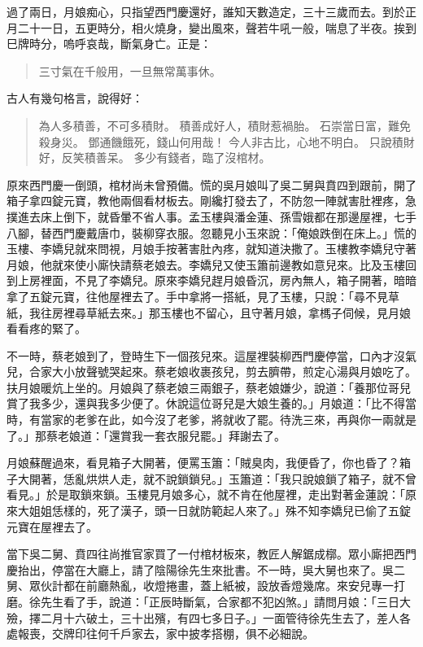 過了兩日，月娘痴心，只指望西門慶還好，誰知天數造定，三十三歲而去。到於正月二十一日，五更時分，相火燒身，變出風來，聲若牛吼一般，喘息了半夜。挨到巳牌時分，嗚呼哀哉，斷氣身亡。正是：
\begin{quote}
三寸氣在千般用，一旦無常萬事休。
\end{quote}
古人有幾句格言，說得好：
\begin{quote}
為人多積善，不可多積財。
積善成好人，積財惹禍胎。
石崇當日富，難免殺身災。
鄧通饑餓死，錢山何用哉！
今人非古比，心地不明白。
只說積財好，反笑積善呆。
多少有錢者，臨了沒棺材。
\end{quote}

原來西門慶一倒頭，棺材尚未曾預備。慌的吳月娘叫了吳二舅與賁四到跟前，開了箱子拿四錠元寶，教他兩個看材板去。剛纔打發去了，不防忽一陣就害肚裡疼，急撲進去床上倒下，就昏暈不省人事。孟玉樓與潘金蓮、孫雪娥都在那邊屋裡，七手八腳，替西門慶戴唐巾，裝柳穿衣服。忽聽見小玉來說：「俺娘跌倒在床上。」慌的玉樓、李嬌兒就來問視，月娘手按著害肚內疼，就知道決撒了。玉樓教李嬌兒守著月娘，他就來使小廝快請蔡老娘去。李嬌兒又使玉簫前邊教如意兒來。比及玉樓回到上房裡面，不見了李嬌兒。原來李嬌兒趕月娘昏沉，房內無人，箱子開著，暗暗拿了五錠元寶，往他屋裡去了。手中拿將一搭紙，見了玉樓，只說：「尋不見草紙，我往房裡尋草紙去來。」那玉樓也不留心，且守著月娘，拿榪子伺候，見月娘看看疼的緊了。

不一時，蔡老娘到了，登時生下一個孩兒來。這屋裡裝柳西門慶停當，口內才沒氣兒，合家大小放聲號哭起來。蔡老娘收裹孩兒，剪去臍帶，煎定心湯與月娘吃了。扶月娘暖炕上坐的。月娘與了蔡老娘三兩銀子，蔡老娘嫌少，說道：「養那位哥兒賞了我多少，還與我多少便了。休說這位哥兒是大娘生養的。」月娘道：「比不得當時，有當家的老爹在此，如今沒了老爹，將就收了罷。待洗三來，再與你一兩就是了。」那蔡老娘道：「還賞我一套衣服兒罷。」拜謝去了。

月娘蘇醒過來，看見箱子大開著，便罵玉簫：「賊臭肉，我便昏了，你也昏了？箱子大開著，恁亂烘烘人走，就不說鎖鎖兒。」玉簫道：「我只說娘鎖了箱子，就不曾看見。」於是取鎖來鎖。玉樓見月娘多心，就不肯在他屋裡，走出對著金蓮說：「原來大姐姐恁樣的，死了漢子，頭一日就防範起人來了。」殊不知李嬌兒已偷了五錠元寶在屋裡去了。

當下吳二舅、賁四往尚推官家買了一付棺材板來，教匠人解鋸成槨。眾小廝把西門慶抬出，停當在大廳上，請了陰陽徐先生來批書。不一時，吳大舅也來了。吳二舅、眾伙計都在前廳熱亂，收燈捲畫，蓋上紙被，設放香燈幾席。來安兒專一打磨。徐先生看了手，說道：「正辰時斷氣，合家都不犯凶煞。」請問月娘：「三日大殮，擇二月十六破土，三十出殯，有四七多日子。」一面管待徐先生去了，差人各處報喪，交牌印往何千戶家去，家中披孝搭棚，俱不必細說。


